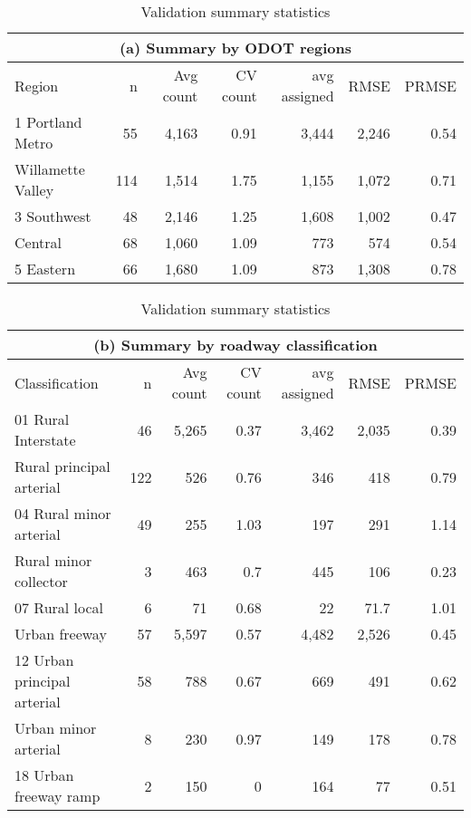 \begin{table}
\centering
\caption{Validation summary statistics}
\label{tab:ct-assignment-statistics}

\begin{tabular}{lrrrrrr}
\\[-5pt]
\multicolumn{7}{c}{(a) Summary by ODOT regions} \\
\hline
Region & n & Avg count & CV count & avg assigned & RMSE & PRMSE \\
\hline
1 Portland Metro & 55 & 4,163 & 0.91 & 3,444 & 2,246 & 0.54 \\
\gray 2 Willamette Valley & 114 & 1,514 & 1.75 & 1,155 & 1,072 & 0.71 \\
3 Southwest & 48 & 2,146 & 1.25 & 1,608 & 1,002 & 0.47 \\
\gray 4 Central & 68 & 1,060 & 1.09 & 773 & 574 & 0.54 \\
5 Eastern & 66 & 1,680 & 1.09 & 873 & 1,308 & 0.78 \\
\end{tabular}

\begin{tabular}{lrrrrrr}
\\[-5pt]
\multicolumn{7}{c}{(b) Summary by roadway classification} \\
\hline
Classification & n & Avg count & CV count & avg assigned & RMSE & PRMSE \\
\hline
01 Rural Interstate & 46 & 5,265 & 0.37 & 3,462 & 2,035 & 0.39 \\
\gray 02 Rural principal arterial & 122 & 526 & 0.76 & 346 & 418 & 0.79 \\
04 Rural minor arterial & 49 & 255 & 1.03 & 197 & 291 & 1.14 \\
\gray 06 Rural minor collector & 3 & 463 & 0.7 & 445 & 106 & 0.23 \\
07 Rural local & 6 & 71 & 0.68 & 22 & 71.7 & 1.01 \\
\gray 11 Urban freeway & 57 & 5,597 & 0.57 & 4,482 & 2,526 & 0.45 \\
12 Urban principal arterial & 58 & 788 & 0.67 & 669 & 491 & 0.62 \\
\gray 14 Urban minor arterial & 8 & 230 & 0.97 & 149 & 178 & 0.78 \\
18 Urban freeway ramp & 2 & 150 & 0 & 164 & 77 & 0.51 \\
\hline
\end{tabular}
\end{table}
